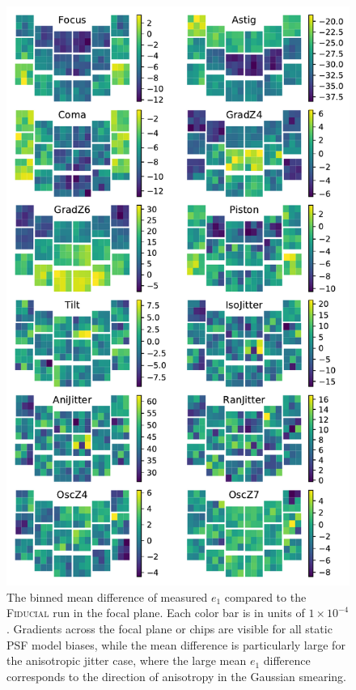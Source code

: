 \documentclass[aps,prd, amsmath,amssymb,superscriptaddress,showkeys,nofootinbib,reprint,preprintnumbers]{revtex4-1}
\begin{document}
\begin{figure}
\begin{center}
\includegraphics[width=\columnwidth]{figures/focal_mean_e1.pdf}
\end{center}
\caption[]{
The binned mean difference of measured $e_1$ compared to the \textsc{Fiducial} run in the focal plane. Each color bar is in units of $1\times 10^{-4}$. Gradients across the focal plane or chips are visible for all static PSF model biases, while the mean difference is particularly large for the anisotropic jitter case, where the large mean $e_1$ difference corresponds to the direction of anisotropy in the Gaussian smearing.
\label{fig:focal_mean_e1}}
\end{figure}
\end{document}
